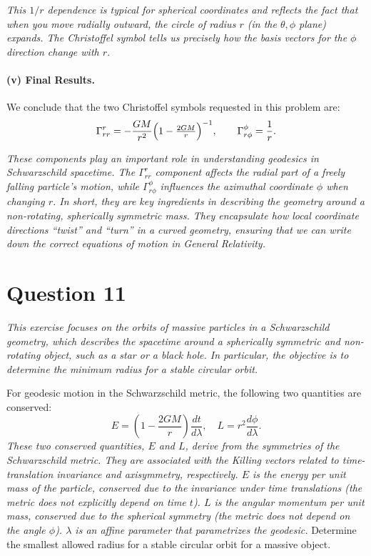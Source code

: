 \documentclass{article}
\begin{document}
\emph{This \(1/r\) dependence is typical for spherical coordinates and reflects the fact that when you move radially outward, the circle of radius \(r\) (in the \(\theta,\phi\) plane) expands. The Christoffel symbol tells us precisely how the basis vectors for the \(\phi\) direction change with \(r\).}

\paragraph{(v) Final Results.}
We conclude that the two Christoffel symbols requested in this problem are:
\[
\Gamma^r_{rr}
=
-\frac{GM}{r^2}
\Bigl(1 - \tfrac{2GM}{r}\Bigr)^{-1},
\qquad
\Gamma^\phi_{r\phi}
=
\frac{1}{r}.
\]

\emph{These components play an important role in understanding geodesics in Schwarzschild spacetime. The \(\Gamma^r_{rr}\) component affects the radial part of a freely falling particle’s motion, while \(\Gamma^\phi_{r\phi}\) influences the azimuthal coordinate \(\phi\) when changing \(r\). In short, they are key ingredients in describing the geometry around a non-rotating, spherically symmetric mass. They encapsulate how local coordinate directions ``twist'' and ``turn'' in a curved geometry, ensuring that we can write down the correct equations of motion in General Relativity.}

\section*{Question 11}

\textit{This exercise focuses on the orbits of massive particles in a Schwarzschild geometry, which describes the spacetime around a spherically symmetric and non-rotating object, such as a star or a black hole. In particular, the objective is to determine the minimum radius for a stable circular orbit.}

For geodesic motion in the Schwarzschild metric, the following two quantities are conserved:
\[
E = \left(1 - \frac{2GM}{r}\right) \frac{dt}{d\lambda}, 
\quad
L = r^{2} \frac{d\phi}{d\lambda}.
\]
\textit{These two conserved quantities, \(E\) and \(L\), derive from the symmetries of the Schwarzschild metric. They are associated with the Killing vectors related to time-translation invariance and axisymmetry, respectively. \(E\) is the energy per unit mass of the particle, conserved due to the invariance under time translations (the metric does not explicitly depend on time \(t\)). \(L\) is the angular momentum per unit mass, conserved due to the spherical symmetry (the metric does not depend on the angle \(\phi\)). \(\lambda\) is an affine parameter that parametrizes the geodesic.}
Determine the smallest allowed radius for a stable circular orbit for a massive object.
\end{document}
